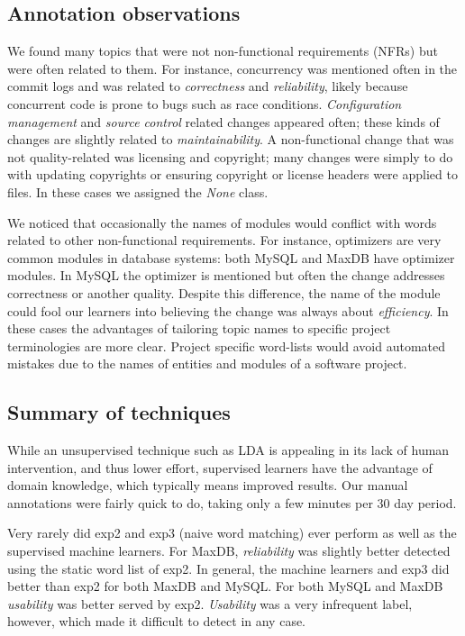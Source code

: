 \documentclass[]{sig-alternate}
\begin{document}
\subsection{Annotation observations}
We found many topics that were not non-functional requirements (NFRs) but were often related to them. 
For instance, concurrency was mentioned often in the commit logs and was related to \emph{correctness} and \emph{reliability}, likely because concurrent code is prone to bugs such as race conditions. %
\emph{Configuration management} and \emph{source control} related changes appeared often; %
these kinds of changes are slightly related to \emph{maintainability}. 
A non-functional change that was not quality-related was licensing and copyright; many changes were simply to do with updating copyrights or ensuring copyright or license headers were applied to files. In these cases we assigned the \emph{None} class.

We noticed that occasionally the names of modules would conflict with words related to other non-functional requirements. 
For instance, optimizers are very common modules in database systems: both MySQL and MaxDB have optimizer modules. 
In MySQL the optimizer is mentioned but often the change addresses  correctness or another quality. 
Despite this difference, the name of the module could fool our learners into believing the change was always about \emph{efficiency}. 
In these cases the advantages of tailoring topic names to specific project terminologies are more clear. 
Project specific word-lists would avoid automated mistakes due to the names of entities and modules of a software project.

\subsection{Summary of techniques}
While an unsupervised technique such as LDA is appealing in its lack of human intervention, and thus lower effort, 
supervised learners have the advantage of domain knowledge, which typically means improved results. 
Our manual annotations were fairly quick to do, taking only a few minutes per 30 day period. 

Very rarely did \textsf{exp2} and \textsf{exp3} (naive word matching) ever perform as well as the supervised machine learners. 
For MaxDB, \textit{reliability} was slightly better detected using the static word list of \textsf{exp2}. 
In general, the machine learners and \textsf{exp3} did better than \textsf{exp2} for both MaxDB and MySQL. 
For both MySQL and MaxDB \textit{usability} was better served by \textsf{exp2}. 
\textit{Usability} was a very infrequent label, however, which made it difficult to detect in any case.
\end{document}
